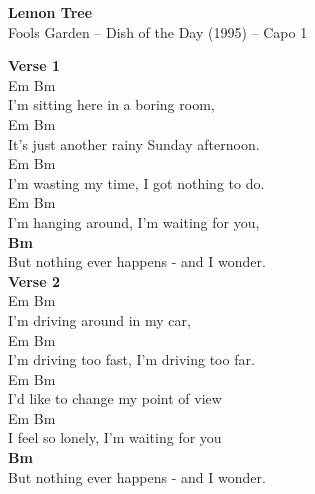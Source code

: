 \documentclass[a4paper]{article}
\begin{document}
    \begin{center}
        \textbf{Lemon Tree}
        ~\\
        Fools Garden -- Dish of the Day (1995)
         -- Capo 1
    \end{center}
    {
        \scriptsize
        \textbf{Verse 1}
        ~\\
        {
            \cutive
            \obeyspaces
      Em             Bm
\\
I'm sitting here in a boring room,
\\
     Em                        Bm
\\
It's just another rainy Sunday afternoon.
\\
    Em              Bm
\\
I'm wasting my time, I got nothing to do.
\\
    Em                 Bm
\\
I'm hanging around, I'm waiting for you,
\\

        }
        \textbf{Bm}
        ~\\
        {
            \cutive
            \obeyspaces
But nothing ever happens - and I wonder.
\\

        }
        \textbf{Verse 2}
        ~\\
        {
            \cutive
            \obeyspaces
      Em             Bm
\\
I'm driving around in my car,
\\
     Em                        Bm
\\
I'm driving too fast, I'm driving too far.
\\
    Em              Bm
\\
I'd like to change my point of view
\\
    Em                 Bm
\\
I feel so lonely, I'm waiting for you
\\

        }
        \textbf{Bm}
        ~\\
        {
            \cutive
            \obeyspaces
But nothing ever happens - and I wonder.
\\

}}
\end{document}
